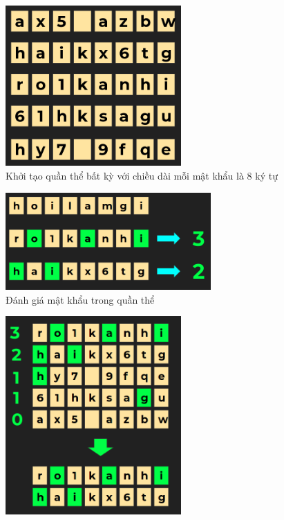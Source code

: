 \documentclass[14pt]{article}
\begin{document}
	\begin{center}
		
		
		
		\begin{figure}[htbp]
			\centering
			\includegraphics[width=0.6\textwidth]{./Image/step1.png}
			\caption{Khởi tạo quần thể bất kỳ với chiều dài mỗi mật khẩu là 8 ký tự }
			\label{fig:mylabel}
		\end{figure}
		\begin{figure}[htbp]
			\centering
			\includegraphics[width=0.7\textwidth]{./Image/step2.png}
			\caption{Đánh giá mật khẩu trong quần thể }
			\label{fig:mylabel}
		\end{figure}
		\begin{figure}[htbp]
			\centering
			\includegraphics[width=0.6\textwidth]{./Image/step3.png}

\end{figure}
\end{center}
\end{document}
